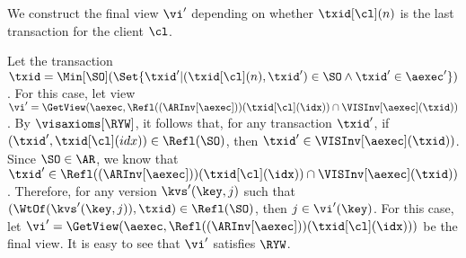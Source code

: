 \COMPLETELET{\RYW}
We construct the final view \( \vi'\) depending on whether \( \txid[\cl](n) \) is the last transaction for the client \( \cl \).
\begin{enumerate}
    Let the transaction 
    \( \txid = \Min[\SO](\Set{ \txid' | (\txid[\cl](n), \txid') \in \SO \land \txid' \in \aexec' }) \).
    For this case, let view 
    \( \vi' = \GetView(\aexec, \Refl((\ARInv[\aexec]))(\txid[\cl](\idx)) \cap \VISInv[\aexec](\txid)) \).
    By \( \visaxioms[\RYW] \), it follows that, for any transaction \( \txid' \),
    if \( ( \txid',\txid[\cl](idx) ) \in \Refl(\SO) \), then
    \( \txid' \in \VISInv[\aexec](\txid)) \).
    Since \( \SO \in \AR \), we know that 
    \( \txid' \in \Refl((\ARInv[\aexec]))(\txid[\cl](\idx)) \cap \VISInv[\aexec](\txid)) \).
    Therefore, for any version \( \kvs'(\key,j)\) such that 
    \( ( \WtOf(\kvs'(\key,j)), \txid) \in \Refl(\SO) \),
    then \( j \in \vi'(\key)\).
    For this case, let 
    \( \vi' = \GetView(\aexec, \Refl((\ARInv[\aexec]))(\txid[\cl](\idx))) \) be the final view.
    It is easy to see that \( \vi' \) satisfies \( \RYW \). 
\end{enumerate}
